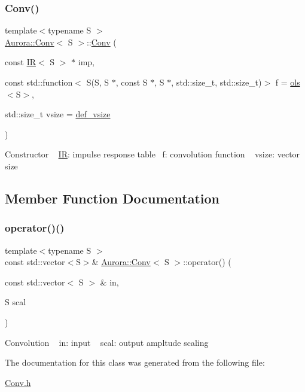 \subsubsection{\texorpdfstring{Conv()}{Conv()}}
{\footnotesize\ttfamily template$<$typename S $>$ \\
\hyperlink{class_aurora_1_1_conv}{Aurora\+::\+Conv}$<$ S $>$\+::\hyperlink{class_aurora_1_1_conv}{Conv} (\begin{DoxyParamCaption}\item[{const \hyperlink{class_aurora_1_1_i_r}{IR}$<$ S $>$ $\ast$}]{imp,  }\item[{const std\+::function$<$ S(S, S $\ast$, const S $\ast$, S $\ast$, std\+::size\+\_\+t, std\+::size\+\_\+t)$>$}]{f = {\ttfamily \hyperlink{namespace_aurora_a7ec189488ba66508d8df1c1670823365}{ols}$<$S$>$},  }\item[{std\+::size\+\_\+t}]{vsize = {\ttfamily \hyperlink{namespace_aurora_afaaddf667a06e7ce23c667a8b7295263}{def\+\_\+vsize}} }\end{DoxyParamCaption})\hspace{0.3cm}{\ttfamily [inline]}}

Constructor ~\newline
\hyperlink{class_aurora_1_1_i_r}{IR}\+: impulse response table~\newline
f\+: convolution function ~\newline
vsize\+: vector size 

\subsection{Member Function Documentation}
\mbox{\label{class_aurora_1_1_conv_aeefccb7a11338388723bb78e025ad030}} 
\subsubsection{\texorpdfstring{operator()()}{operator()()}}
{\footnotesize\ttfamily template$<$typename S $>$ \\
const std\+::vector$<$S$>$\& \hyperlink{class_aurora_1_1_conv}{Aurora\+::\+Conv}$<$ S $>$\+::operator() (\begin{DoxyParamCaption}\item[{const std\+::vector$<$ S $>$ \&}]{in,  }\item[{S}]{scal }\end{DoxyParamCaption})\hspace{0.3cm}{\ttfamily [inline]}}

Convolution ~\newline
in\+: input ~\newline
scal\+: output ampltude scaling 

The documentation for this class was generated from the following file\+:\begin{DoxyCompactItemize}
\item 
\hyperlink{_conv_8h}{Conv.\+h}\end{DoxyCompactItemize}
